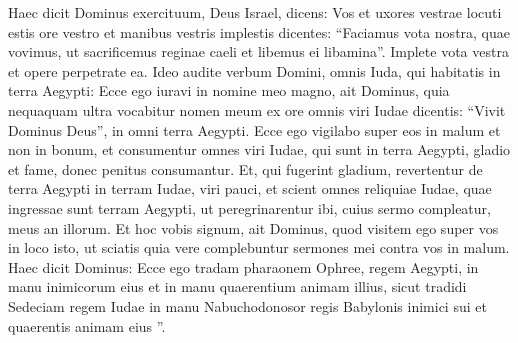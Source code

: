 \begin{biblechapter}
\begin{biblechapter}
\begin{biblechapter}
\begin{biblechapter}
\begin{biblechapter}
\begin{biblechapter}
\begin{biblechapter}
\begin{biblechapter}
\begin{biblechapter}
\begin{biblechapter}
\begin{biblechapter}
\begin{biblechapter}
\begin{biblechapter}
\begin{biblechapter}
\begin{biblechapter}
\begin{biblechapter}
\begin{biblechapter}
\begin{biblechapter}
\begin{biblechapter}
\begin{biblechapter}
\begin{biblechapter}
\begin{biblechapter}
\begin{biblechapter}
\begin{biblechapter}
\begin{biblechapter}
\begin{biblechapter}
\begin{biblechapter}
\begin{biblechapter}
\begin{biblechapter}
\begin{biblechapter}
\begin{biblechapter}
\begin{biblechapter}
\begin{biblechapter}
\begin{biblechapter}
\begin{biblechapter}
\begin{biblechapter}
\begin{biblechapter}
\begin{biblechapter}
\begin{biblechapter}
\begin{biblechapter}
\begin{biblechapter}
\begin{biblechapter}
\begin{biblechapter}
\begin{biblechapter}
\verse Haec dicit Dominus exercituum, Deus Israel, dicens: Vos et uxores vestrae locuti estis ore vestro et manibus vestris implestis dicentes: “Faciamus vota nostra, quae vovimus, ut sacrificemus reginae caeli et libemus ei libamina”. Implete vota vestra et opere perpetrate ea. 
\verse Ideo audite verbum Domini, omnis Iuda, qui habitatis in terra Aegypti: Ecce ego iuravi in nomine meo magno, ait Dominus, quia nequaquam ultra vocabitur nomen meum ex ore omnis viri Iudae dicentis: “Vivit Dominus Deus”, in omni terra Aegypti. 
\verse Ecce ego vigilabo super eos in malum et non in bonum, et consumentur omnes viri Iudae, qui sunt in terra Aegypti, gladio et fame, donec penitus consumantur. 
\verse Et, qui fugerint gladium, revertentur de terra Aegypti in terram Iudae, viri pauci, et scient omnes reliquiae Iudae, quae ingressae sunt terram Aegypti, ut peregrinarentur ibi, cuius sermo compleatur, meus an illorum.
 \verse Et hoc vobis signum, ait Dominus, quod visitem ego super vos in loco isto, ut sciatis quia vere complebuntur sermones mei contra vos in malum. 
\verse Haec dicit Dominus: Ecce ego tradam pharaonem Ophree, regem Aegypti, in manu inimicorum eius et in manu quaerentium animam illius, sicut tradidi Sedeciam regem Iudae in manu Nabuchodonosor regis Babylonis inimici sui et quaerentis animam eius ”.
 

\end{biblechapter}
\end{biblechapter}
\end{biblechapter}
\end{biblechapter}
\end{biblechapter}
\end{biblechapter}
\end{biblechapter}
\end{biblechapter}
\end{biblechapter}
\end{biblechapter}
\end{biblechapter}
\end{biblechapter}
\end{biblechapter}
\end{biblechapter}
\end{biblechapter}
\end{biblechapter}
\end{biblechapter}
\end{biblechapter}
\end{biblechapter}
\end{biblechapter}
\end{biblechapter}
\end{biblechapter}
\end{biblechapter}
\end{biblechapter}
\end{biblechapter}
\end{biblechapter}
\end{biblechapter}
\end{biblechapter}
\end{biblechapter}
\end{biblechapter}
\end{biblechapter}
\end{biblechapter}
\end{biblechapter}
\end{biblechapter}
\end{biblechapter}
\end{biblechapter}
\end{biblechapter}
\end{biblechapter}
\end{biblechapter}
\end{biblechapter}
\end{biblechapter}
\end{biblechapter}
\end{biblechapter}
\end{biblechapter}
